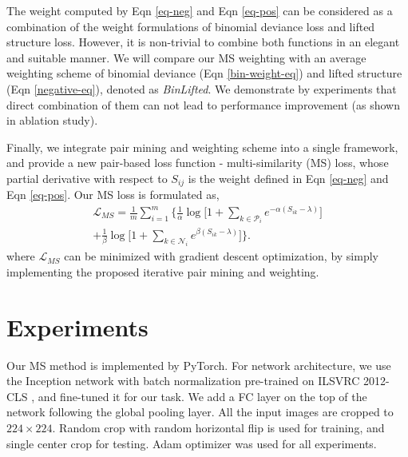 \documentclass[10pt,twocolumn,letterpaper]{article}
\begin{document}
The weight computed by Eqn \ref{eq-neg} and Eqn \ref{eq-pos} can be considered as a combination of the weight formulations of binomial deviance loss and lifted structure loss. However, it is non-trivial to combine both functions in an elegant and suitable manner. 
We will compare our MS weighting with an average weighting scheme of binomial deviance (Eqn \ref{bin-weight-eq}) and lifted structure (Eqn \ref{negative-eq}), denoted as {\it BinLifted}. We demonstrate by experiments that direct combination of them can not lead to performance improvement (as shown in ablation study). 

Finally, we integrate pair mining and weighting scheme into a single framework, and provide a new pair-based loss function - multi-similarity (MS) loss, whose partial derivative with respect to $S_{ij}$ is the weight defined in Eqn \ref{eq-neg} and Eqn \ref{eq-pos}. Our MS loss is formulated as,
\begin{equation}
\begin{split}
	\label{eq-MS}
	\mathcal{L}_{MS} = \frac{1}{m}\sum_{i=1}^m  \bigg\{\frac{1}{\alpha}  { \log \big[1 + \sum_{k  \in \mathcal{P}_i } e^{-\alpha (S_{ik} - \lambda)}}\big]  \\
	+ \frac{1}{\beta }  { \log \big[1+ \sum_{k \in \mathcal{N}_i}
		 e^{\beta (S_{ik} - \lambda)} \big]} \bigg\}.
\end{split}   
\end{equation}
where $\mathcal{L}_{MS}$ can be minimized with gradient descent optimization, by simply implementing the proposed iterative pair mining and weighting.


\section{Experiments}

\label{experiments-section}
Our MS method is implemented by PyTorch. For network architecture, we use the Inception network with batch normalization \cite{batchnorm} pre-trained on ILSVRC 2012-CLS \cite{ILSVRC15},  and fine-tuned it for our task. We add a FC layer on the top of the network following the global pooling layer.
All the input images are cropped to $224 \times 224$.  Random crop with random horizontal flip is used for training, and single center crop for testing. Adam optimizer was used for all experiments.
\end{document}
